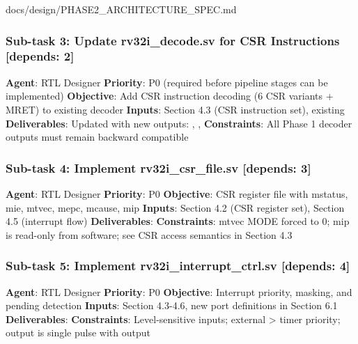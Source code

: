 \begin{relocated}{docs/design/PHASE2_ARCHITECTURE_SPEC.md}
\subsubsection{\texorpdfstring{Sub-task 3: Update
rv32i\_\allowbreak{}decode.sv for CSR Instructions {[}depends:
2{]}}{Sub-task 3: Update rv32i\_decode.sv for CSR Instructions {[}depends: 2{]}}}\label{ds:ch:phase2-architecture:sub-task-3-update-rv32i-decodesv-for-csr-instructions-depends-2}

\textbf{Agent}: RTL Designer \textbf{Priority}: P0 (required before
pipeline stages can be implemented) \textbf{Objective}: Add CSR
instruction decoding (6 CSR variants + MRET) to existing decoder
\textbf{Inputs}: Section 4.3 (CSR instruction set), existing
 \textbf{Deliverables}: Updated
 with new outputs: ,
,  \textbf{Constraints}: All Phase 1 decoder
outputs must remain backward compatible

\subsubsection{\texorpdfstring{Sub-task 4: Implement
rv32i\_\allowbreak{}csr\_\allowbreak{}file.sv {[}depends:
3{]}}{Sub-task 4: Implement rv32i\_csr\_file.sv {[}depends: 3{]}}}\label{ds:ch:phase2-architecture:sub-task-4-implement-rv32i-csr-filesv-depends-3}

\textbf{Agent}: RTL Designer \textbf{Priority}: P0 \textbf{Objective}:
CSR register file with mstatus, mie, mtvec, mepc, mcause, mip
\textbf{Inputs}: Section 4.2 (CSR register set), Section 4.5 (interrupt
flow) \textbf{Deliverables}: 
\textbf{Constraints}: mtvec MODE forced to 0; mip is read-only from
software; see CSR access semantics in Section 4.3

\subsubsection{\texorpdfstring{Sub-task 5: Implement
rv32i\_\allowbreak{}interrupt\_\allowbreak{}ctrl.sv {[}depends:
4{]}}{Sub-task 5: Implement rv32i\_interrupt\_ctrl.sv {[}depends: 4{]}}}\label{ds:ch:phase2-architecture:sub-task-5-implement-rv32i-interrupt-ctrlsv-depends-4}

\textbf{Agent}: RTL Designer \textbf{Priority}: P0 \textbf{Objective}:
Interrupt priority, masking, and pending detection \textbf{Inputs}:
Section 4.3-4.6, new port definitions in Section 6.1
\textbf{Deliverables}: 
\textbf{Constraints}: Level-sensitive inputs; external \textgreater{}
timer priority; output is single  pulse with
 output


\end{relocated}
